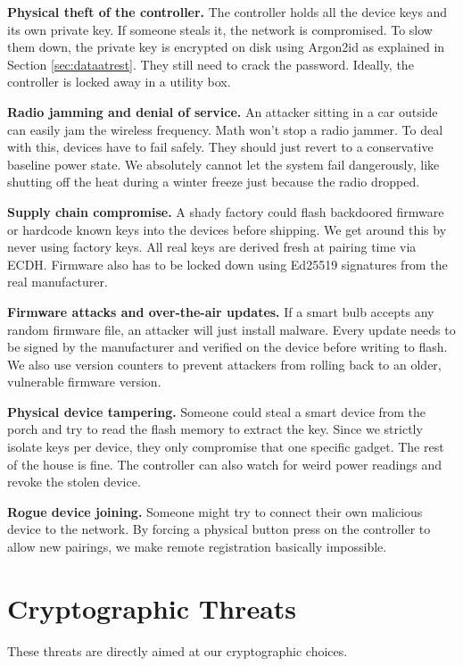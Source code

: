 \documentclass[a4paper,11pt]{article}
\begin{document}
\textbf{Physical theft of the controller.} The controller holds all the device keys and its own private key. If someone steals it, the network is compromised. To slow them down, the private key is encrypted on disk using Argon2id as explained in Section \ref{sec:dataatrest}. They still need to crack the password. Ideally, the controller is locked away in a utility box.

\textbf{Radio jamming and denial of service.} An attacker sitting in a car outside can easily jam the wireless frequency. Math won't stop a radio jammer. To deal with this, devices have to fail safely. They should just revert to a conservative baseline power state. We absolutely cannot let the system fail dangerously, like shutting off the heat during a winter freeze just because the radio dropped.

\textbf{Supply chain compromise.} A shady factory could flash backdoored firmware or hardcode known keys into the devices before shipping. We get around this by never using factory keys. All real keys are derived fresh at pairing time via ECDH. Firmware also has to be locked down using Ed25519 signatures from the real manufacturer.

\textbf{Firmware attacks and over-the-air updates.} If a smart bulb accepts any random firmware file, an attacker will just install malware. Every update needs to be signed by the manufacturer and verified on the device before writing to flash. We also use version counters to prevent attackers from rolling back to an older, vulnerable firmware version.

\textbf{Physical device tampering.} Someone could steal a smart device from the porch and try to read the flash memory to extract the key. Since we strictly isolate keys per device, they only compromise that one specific gadget. The rest of the house is fine. The controller can also watch for weird power readings and revoke the stolen device.

\textbf{Rogue device joining.} Someone might try to connect their own malicious device to the network. By forcing a physical button press on the controller to allow new pairings, we make remote registration basically impossible.

\section{Cryptographic Threats}

These threats are directly aimed at our cryptographic choices.
\end{document}
